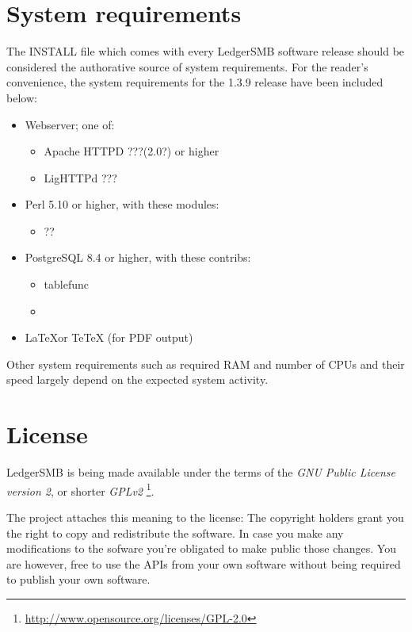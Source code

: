 \section{System requirements}

The INSTALL file which comes with every LedgerSMB software release should be
considered the authorative source of system requirements.  For the reader's
convenience, the system requirements for the 1.3.9 release have been included
below:

\begin{itemize}
\item Webserver; one of:
\begin{itemize}
\item Apache HTTPD ???(2.0?) or higher
\item LigHTTPd ???
\end{itemize}
\item Perl 5.10 or higher, with these modules:
\begin{itemize}
\item ??
\end{itemize}
\item PostgreSQL 8.4 or higher, with these contribs:
\begin{itemize}
\item tablefunc
\item 
\end{itemize}
\item \LaTeX or TeTeX (for PDF output)
\end{itemize}

Other system requirements such as required RAM and number of CPUs and their speed
largely depend on the expected system activity.

\section{License}

LedgerSMB is being made available under the terms of the
\textit{GNU Public License version 2}, or shorter \textit{GPLv2}
\footnote{\url{http://www.opensource.org/licenses/GPL-2.0}}.

The project attaches this meaning to the license:
The copyright holders grant you the right to copy and
redistribute the software.  In case you make any modifications to the sofware
you're obligated to make public those changes.  You are however, free to use
the APIs from your own software without being required to publish your own software.

